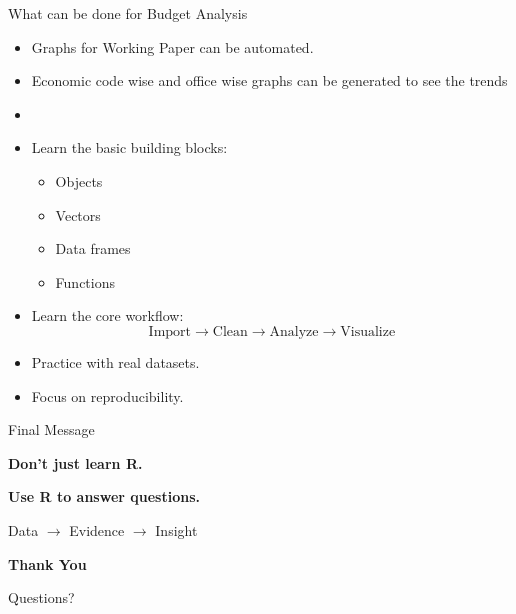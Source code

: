 \documentclass[aspectratio=169,11pt]{beamer}
\begin{document}
	\begin{frame}{What can be done for Budget Analysis}
		
		\begin{itemize}
			\item Graphs for Working Paper can be automated.
			
			\item Economic code wise and office wise graphs can be generated to see the trends
			
			\item 
			
			\item Learn the basic building blocks:
			\begin{itemize}
				\item Objects
				\item Vectors
				\item Data frames
				\item Functions
			\end{itemize}
			
			\item Learn the core workflow:
			\[
			\text{Import}
			\rightarrow
			\text{Clean}
			\rightarrow
			\text{Analyze}
			\rightarrow
			\text{Visualize}
			\]
			
			\item Practice with real datasets.
			
			\item Focus on reproducibility.
		\end{itemize}
		
	\end{frame}
	
	
	\begin{frame}{Final Message}
		
		\begin{center}
			
			\Huge
			\textbf{Don't just learn R.}
			
			\vspace{0.5cm}
			
			\Huge
			\textbf{Use R to answer questions.}
			
			\vspace{1cm}
			
			\Large
			Data $\rightarrow$ Evidence $\rightarrow$ Insight
			
		\end{center}
		
	\end{frame}
	
	
	\begin{frame}
		\centering
		\Huge
		\textbf{Thank You}
		
		\vspace{0.5cm}
		
		\Large
		Questions?
		
	\end{frame}
	
	
\end{document}
